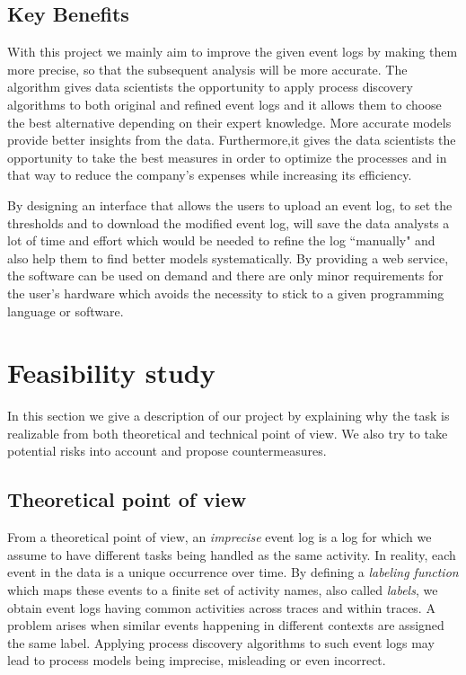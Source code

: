 \documentclass[notitlepage]{article}
\begin{document}
\begin{flushleft}
\subsection{Key Benefits}
 
With this project we mainly aim to improve the given event logs by making them more precise, so that the subsequent analysis will be more accurate. 
The algorithm gives data scientists the opportunity to apply process discovery algorithms to both original and refined event logs and it allows them to choose the best alternative depending on their expert knowledge. 
More accurate models provide better insights from the data. Furthermore,it gives the data scientists the opportunity to take the best measures in order to optimize the processes and in that way to reduce the company's expenses while increasing its efficiency.  

By designing an interface that allows the users to upload an event log, to set the thresholds and to download the modified event log, will save the data analysts a lot of time and effort which would be needed to refine the log ``manually" and also help them to find better models systematically. 
By providing a web service, the software can be used on demand and there are only minor requirements for the user's hardware which avoids the necessity to stick to a given programming language or software.




\section{Feasibility study}
In this section we give a description of our project by explaining why the task is realizable from both theoretical and technical point of view.
We also try to take potential risks into account and propose countermeasures.

\subsection{Theoretical point of view}

From a theoretical point of view, an \textit{imprecise} event log is a log for which we assume to have different tasks being handled as the same activity.
In reality, each event in the data is a unique occurrence over time.
By defining a \textit{labeling  function} which maps these events to a finite set of activity names, also called \textit{labels}, we obtain event logs having common activities across traces and within traces.
A problem arises when similar events happening in different contexts are assigned the same label.
Applying process discovery algorithms to such event logs may lead to process models being imprecise, misleading or even incorrect.


\end{flushleft}
\end{document}
